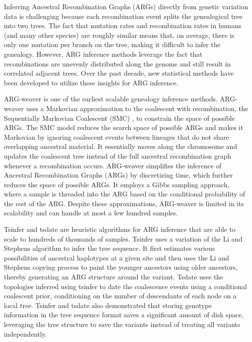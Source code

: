 Inferring Ancestral Recombination Graphs (ARGs) directly from genetic variation data is challenging because each recombination event splits the genealogical tree into two trees. The fact that mutation rates and recombination rates in humans (and many other species) are roughly similar means that, on average, there is only one mutation per branch on the tree, making it difficult to infer the genealogy. However, ARG inference methods leverage the fact that recombinations are unevenly distributed along the genome and still result in correlated adjacent trees. Over the past decade, new statistical methods have been developed to utilize these insights for ARG inference. 

ARG-weaver \cite{rasmussen2014genome} is one of the earliest scalable genealogy inference methods. ARG-weaver uses a Markovian approximation to the coalescent with recombination, the Sequentially Markovian Coalescent (SMC) \cite{mcvean2005approximating}, to constrain the space of possible ARGs. The SMC model reduces the search space of possible ARGs and makes it Markovian by ignoring coalescent events between lineages that do not share overlapping ancestral material. It essentially moves along the chromosome and updates the coalescent tree instead of the full ancestral recombination graph whenever a recombination occurs. ARG-weaver simplifies the inference of Ancestral Recombination Graphs (ARGs) by discretizing time, which further reduces the space of possible ARGs. It employs a Gibbs sampling approach, where a sample is threaded into the ARG based on the conditional probability of the rest of the ARG. Despite these approximations, ARG-weaver is limited in its scalability and can handle at most a few hundred samples.

Tsinfer \cite{Kelleher2019} and tsdate \cite{wohns2022unified} are heuristic algorithms for ARG inference that are able to scale to hundreds of thousands of samples. Tsinfer uses a variation of the Li and Stephens algorithm to infer the tree sequence. It first estimates various possibilities of ancestral haplotypes at a given site and then uses the Li and Stephens copying process to paint the younger ancestors using older ancestors, thereby generating an ARG structure around the variant. Tsdate uses the topologies inferred using tsinfer to date the coalescence events using a conditional coalescent prior, conditioning on the number of descendants of each node on a local tree. Tsinfer and tsdate also demonstrated that storing genotype information in the tree sequence format saves a significant amount of disk space, leveraging the tree structure to save the variants instead of treating all variants independently.


